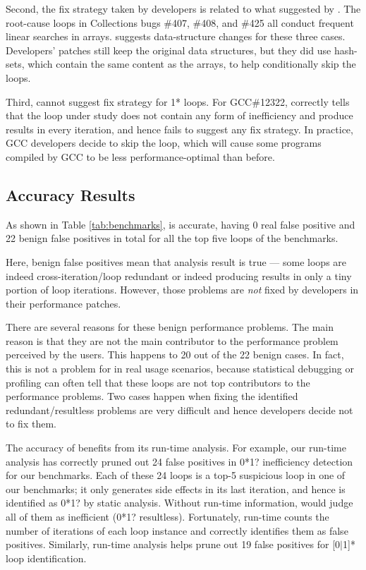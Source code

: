 Second, the fix strategy taken by developers is related to
what suggested by \Tool.
The root-cause loops in 
Collections bugs \#407, \#408, and \#425 all conduct frequent linear searches in arrays.
\Tool suggests data-structure changes for these three cases. Developers' patches 
still keep the original data structures, but they
did use hash-sets, which contain the same content as the arrays,
to help conditionally skip the loops. 

Third, \Tool cannot suggest fix strategy for 1* loops.
For GCC\#12322, \Tool correctly tells that the loop under study
does not contain any form of inefficiency and produce results in every 
iteration, and hence fails to suggest any fix strategy. In practice, GCC
developers decide to skip the loop, which will cause some programs compiled by
GCC
to be less performance-optimal than before. 

\subsection{Accuracy Results}
\label{sec:result_acc}

%

As shown in Table \ref{tab:benchmarks}, \Tool is accurate, having 0 real
false positive and 22 benign false positives in total for all the top five loops
of the \allbugs benchmarks.

Here, benign false positives mean that \Tool analysis result is true ---
some loops are indeed cross-iteration/loop redundant or indeed producing
results in only a tiny portion of loop iterations. However, those
problems are \textit{not} fixed by developers in their performance patches. 

There are several reasons for these benign performance problems. 
The main reason is that they are not the main contributor to the 
performance problem perceived by the users. This happens to 20 out of the
22 benign cases. %
In fact, this is not a problem for \Tool in 
real usage scenarios, because statistical debugging or profiling can often
tell that these loops are not top contributors to the performance
problems.
Two cases happen when fixing the 
identified redundant/resultless problems
are very difficult and hence developers decide not to fix them.

The accuracy of \Tool benefits from its run-time analysis.
For example, our run-time analysis has correctly pruned out 24 false positives
in 0*1? inefficiency detection for our benchmarks. Each of these 24 loops is a
top-5 suspicious loop in one of our benchmarks; it only generates side effects
in its last iteration, and hence is identified as 0*1? by static analysis. 
Without run-time information, \Tool would judge
all of them as inefficient (0*1? resultless). Fortunately,
\Tool run-time counts the number of iterations of each loop instance and
correctly identifies them as false positives. Similarly, \Tool run-time analysis
helps prune out 19 false positives for [0$|$1]* loop identification.


